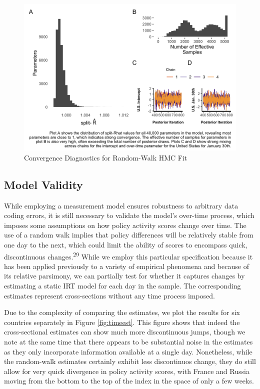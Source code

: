 \documentclass[
]{article}
\begin{document}
\begin{figure}
\includegraphics[width=6.5in]{mcmc_evaluate} \caption{Convergence Diagnostics for Random-Walk HMC Fit}\label{fig:modelconv}
\end{figure}

\hypertarget{model-validity}{%
\subsection*{Model Validity}\label{model-validity}}

While employing a measurement model ensures robustness to arbitrary data coding errors, it is still necessary to validate the model's over-time process, which imposes some assumptions on how policy activity scores change over time. The use of a random walk implies that policy differences will be relatively stable from one day to the next, which could limit the ability of scores to encompass quick, discontinuous changes.\textsuperscript{29} While we employ this particular specification because it has been applied previously to a variety of empirical phenomena and because of its relative parsimony, we can partially test for whether it captures changes by estimating a static IRT model for each day in the sample. The corresponding estimates represent cross-sections without any time process imposed.

Due to the complexity of comparing the estimates, we plot the results for six countries separately in Figure \ref{fig:timeest}. This figure shows that indeed the cross-sectional estimates can show much more discontinuous jumps, though we note at the same time that there appears to be substantial noise in the estimates as they only incorporate information available at a single day. Nonetheless, while the random-walk estimates certainly exhibit less discontinuos change, they do still allow for very quick divergence in policy activity scores, with France and Russia moving from the bottom to the top of the index in the space of only a few weeks.
\end{document}
